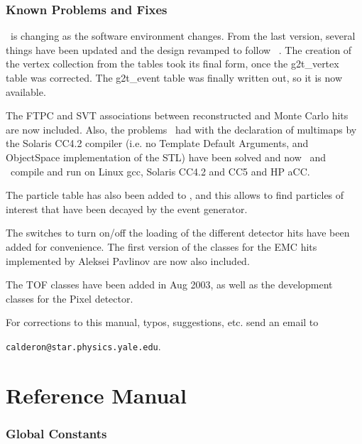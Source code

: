 
\section{Known Problems and Fixes}

\StMcEvent\ is changing as the software environment changes.  From the last
version, several things have been updated and the design revamped to
follow \StEvent\ .
The creation of the vertex collection from the tables took its final
form, once the g2t\_vertex table was corrected.  The g2t\_event table was
finally written out, so it is now available.

The FTPC and SVT associations between reconstructed and Monte Carlo
hits are now included.
Also, the problems \StAssociationMaker\ had with the declaration of multimaps
by the Solaris CC4.2 compiler (i.e. no Template Default Arguments, and
ObjectSpace implementation of the STL) have been solved and
now \StMcEvent\ and \StAssociationMaker\ compile and run
on Linux gcc, Solaris CC4.2 and CC5 and HP aCC.

The particle table has also been added to \StMcEvent, and this
allows to find particles of interest that have been decayed by
the event generator.

The switches to turn on/off the loading of the different detector hits
have been added for convenience.  The first version of the classes
for the EMC hits implemented by Aleksei Pavlinov are now also included.

The TOF classes have been added in Aug 2003, as well as the development
classes for the Pixel detector.

For corrections to this manual, typos, suggestions, etc. send an email
to

{\tt calderon@star.physics.yale.edu}.
\clearpage

%
%
\part{Reference Manual}
\label{sec:refman}
\clearpage


\section{Global Constants}

